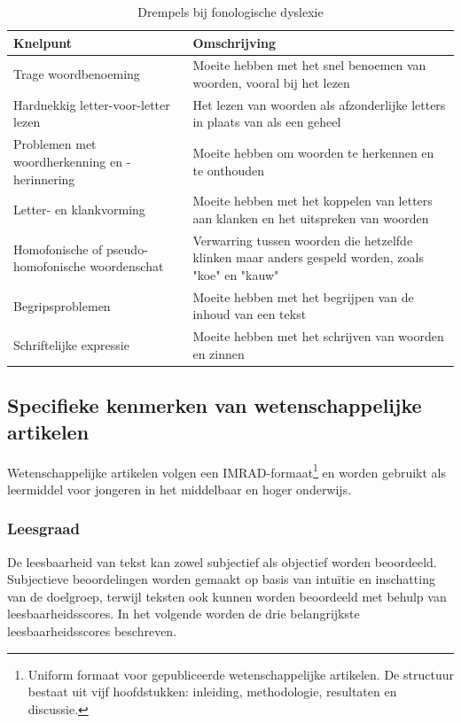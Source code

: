 \begin{table}[!ht]
	\centering
	\begin{tabular}{|l|l|}
		\hline
		Knelpunt & Omschrijving \\ \hline
		Trage woordbenoeming & Moeite hebben met het snel benoemen van woorden, vooral bij het lezen \\ \hline
		Hardnekkig letter-voor-letter lezen & Het lezen van woorden als afzonderlijke letters in plaats van als een geheel \\ \hline
		Problemen met woordherkenning en -herinnering & Moeite hebben om woorden te herkennen en te onthouden \\ \hline
		Letter- en klankvorming & Moeite hebben met het koppelen van letters aan klanken en het uitspreken van woorden \\ \hline
		Homofonische of pseudo-homofonische woordenschat & Verwarring tussen woorden die hetzelfde klinken maar anders gespeld worden, zoals "koe" en "kauw" \\ \hline
		Begripsproblemen & Moeite hebben met het begrijpen van de inhoud van een tekst \\ \hline
		Schriftelijke expressie & Moeite hebben met het schrijven van woorden en zinnen \\ \hline
	\end{tabular}
	\caption{Drempels bij fonologische dyslexie \autocite{Bonte2020, RiveroContreras2021, Zhang2021}}
	\label{tab:dyslexie-drempels}
\end{table}

\subsection{Specifieke kenmerken van wetenschappelijke artikelen}

Wetenschappelijke artikelen volgen een IMRAD-formaat\footnote{Uniform formaat voor gepubliceerde wetenschappelijke artikelen. De structuur bestaat uit vijf hoofdstukken: inleiding, methodologie, resultaten en discussie.} en worden gebruikt als leermiddel voor jongeren in het middelbaar en hoger onderwijs. 

\subsubsection{Leesgraad}

De leesbaarheid van tekst kan zowel subjectief als objectief worden beoordeeld. Subjectieve beoordelingen worden gemaakt op basis van intuïtie en inschatting van de doelgroep, terwijl teksten ook kunnen worden beoordeeld met behulp van leesbaarheidsscores. In het volgende worden de drie belangrijkste leesbaarheidsscores beschreven.

